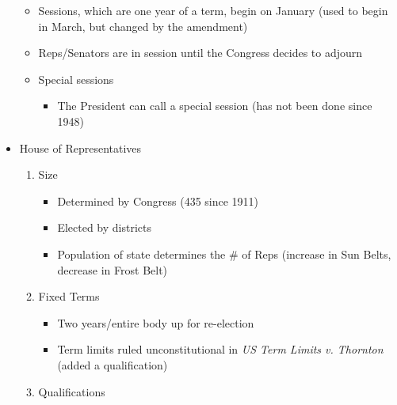 \documentclass[12pt]{article}
\begin{document}
\begin{itemize}
\begin{itemize}
      \item Sessions, which are one year of a term, begin on January  (used to begin in March, but changed by the  amendment)

      \item Reps/Senators are in session until the Congress decides to adjourn

      \item Special sessions

        \begin{itemize}

          \item The President can call a special session (has not been done since 1948)

        \end{itemize}

    \end{itemize}

  \item House of Representatives

    \begin{enumerate}

      \item Size

        \begin{itemize}

          \item Determined by Congress (435 since 1911)

          \item Elected by districts

          \item Population of state determines the \# of Reps (increase in Sun Belts, decrease in Frost Belt)

        \end{itemize}

      \item Fixed Terms

        \begin{itemize}

          \item Two years/entire body up for re-election

          \item Term limits ruled unconstitutional in \textit{US Term Limits v. Thornton} (added a qualification)

        \end{itemize}

      \item Qualifications


\end{enumerate}
\end{itemize}
\end{document}
